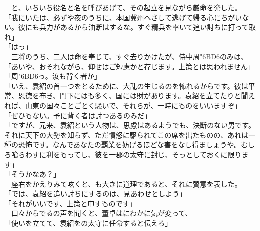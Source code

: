 \documentclass[
  paper=a5,
  fontsize=10pt,
  jafontsize=9.5pt,
  tate,                  %
  open_bracket_pos=nibu, %
]{jlreq}
\begin{document}
　と、いちいち役名と名を呼びあげて、その起立を見ながら厳命を発した。\\


「我にいたは、必ずや夜のうちに、本国冀州へさして逃げて帰る心にちがいない。彼にも兵力があるから油断はするな。すぐ精兵を率いて追い討ちに打って取れ」\\


「はっ」\\


　三将のうち、二人は命を奉じて、すぐ去りかけたが、侍中周{\char"6BD6}のみは、\\


「あいや、おそれながら、仰せはご短慮かと存じます。上策とは思われません」\\


「周{\char"6BD6}っ。汝も背く者か」\\


「いえ、袁紹の首一つをとるために、大乱の生じるのを怖れるからです。彼は平常、恩徳を布き、門下にはも多く、国には財があります。袁紹を立てたりと聞えれば、山東の国々ことごとく騒いで、それらが、一時にものをいいますぞ」\\


「ぜひもない。予に背く者は討つあるのみだ」\\


「ですが、元来、袁紹という人物は、思慮はあるようでも、決断のない男です。それに天下の大勢を知らず、ただ憤怒に駆られてこの席を出たものの、あれは一種の恐怖です。なんであなたの覇業を妨げるほどな害をなし得ましょうや。むしろ喰らわすに利をもってし、彼を一郡の太守に封じ、そっとしておくに限ります」\\


「そうかなあ？」\\


　座右をかえりみて呟くと、も大きに道理であると、それに賛意を表した。\\


「では、袁紹を追い討ちにするのは、見あわせとしよう」\\


「それがいいです、上策と申すものです」\\


　口々からでるの声を聞くと、董卓はにわかに気が変って、\\


「使いを立てて、袁紹をの太守に任命すると伝えろ」\\
\end{document}
